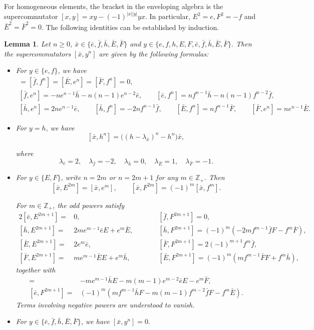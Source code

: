 \documentclass[a4paper,10pt]{article}
\theoremstyle{definition}
\theoremstyle{plain}
\newtheorem{lemma}[definition]{Lemma}
\theoremstyle{remark}
\theoremstyle{mystyle}
\numberwithin{equation}{section}
\begin{document}
For homogeneous elements, the bracket in the enveloping algebra is the supercommutator $[x,y]=xy-(-1)^{|x||y|}yx$. In particular, $E^2=e,F^2=-f$ and $\bar E^2=\bar F^2=0$.
The following identities can be established by induction.
\begin{lemma}\label{[]}
    Let $n\geq 0$, $\bar x\in\{\bar e,\bar f,\bar h,\bar E,\bar F\}$ and $y\in\{e,f,h,E,F,\bar e,\bar f,\bar h,\bar E,\bar F\}.$ Then the supercommutators $[\bar x,y^n]$ are given by the following formulas:
\begin{itemize}
    \item[(1).] For \(y\in \{e,f\}\), we have
\begin{gather*}
[\bar e,e^n]=[\bar f,f^n]=[\bar E,e^n]=[\bar F,f^n]=0,\\ 
[\bar f,e^n]=-ne^{n-1}\bar h-n(n-1)e^{n-2}\bar e,\qquad [\bar e,f^n]=nf^{n-1}\bar h-n(n-1)f^{n-2}\bar f,\\
[\bar h,e^n]=2ne^{n-1}\bar e,\qquad [\bar h,f^n]=-2nf^{n-1}\bar f,\qquad [\bar E,f^n]=nf^{n-1}\bar F,\qquad [\bar F,e^n]=ne^{n-1}\bar E.
\end{gather*}
\item[(2).] For \(y=h\), we have
\[
[\bar x,h^n]
=\bigl((h-\lambda_{\bar x})^n-h^n\bigr)\bar x,
\]

where
\[
\lambda_{\bar e}=2,\quad
\lambda_{\bar f}=-2,\quad
\lambda_{\bar h}=0,\quad
\lambda_{\bar E}=1,\quad
\lambda_{\bar F}=-1.
\]
\item[(3).] For \(y\in \{E,F\}\), write \(n=2m\) or \(n=2m+1\) for any $m\in\mathbb{Z_+}$. Then
\[
[\bar x,E^{2m}]=[\bar x,e^m],
\qquad
[\bar x,F^{2m}]=(-1)^m[\bar x,f^m].
\]

For \(m\in\mathbb{Z}_+\), the odd powers satisfy
\begin{alignat*}{2}
[\bar{e}, E^{2m+1}] =& 0,\qquad &&[\bar{f}, F^{2m+1}] = 0, \\[1ex]
[\bar{h}, E^{2m+1}] =& 2m e^{m-1} \bar{e} E + e^m \bar{E},\qquad && [\bar{h}, F^{2m+1}] = (-1)^m (-2m f^{m-1} \bar{f} F - f^m \bar{F}), \\[1ex]
[\bar{E}, E^{2m+1}] =& 2e^m \bar{e},\qquad && [\bar{F}, F^{2m+1}] = 2(-1)^{m+1} f^m \bar{f}, \\[1ex]
[\bar{F}, E^{2m+1}] =& m e^{m-1} \bar{E} E + e^m \bar{h},\qquad &&[\bar{E}, F^{2m+1}] = (-1)^m (m f^{m-1} \bar{F} F + f^m \bar{h}),
\end{alignat*}
together with 
\begin{align*}
[\bar{f}, E^{2m+1}] =& -m e^{m-1} \bar{h} E - m(m-1) e^{m-2} \bar{e} E - e^m \bar{F},\\[1ex]
[\bar{e}, F^{2m+1}] =& (-1)^m (m f^{m-1} \bar{h} F - m(m-1) f^{m-2} \bar{f} F - f^m \bar{E}).
\end{align*}
Terms involving negative powers are understood to vanish.
\item[(4).] For \(y\in\{\bar e,\bar f,\bar h,\bar E,\bar F\}\), we have
$[\bar x,y^n]=0.$
\end{itemize}
\end{lemma}
\end{document}

